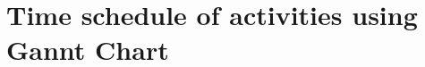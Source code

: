 \documentclass[a4paper,12pt]{report}
\begin{document}
\chapter{Time schedule of activities using Gannt Chart}

%
\end{document}
